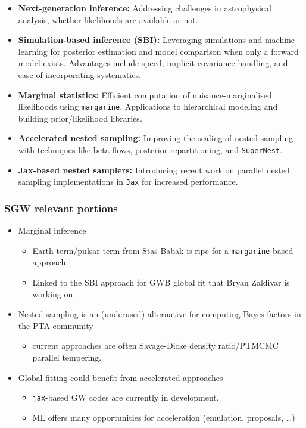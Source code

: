 \documentclass[aspectratio=169]{beamer}
\begin{document}
\begin{frame}
\begin{itemize}
        \item \textbf{Next-generation inference:} Addressing challenges in astrophysical analysis, whether likelihoods are available or not.
        \item \textbf{Simulation-based inference (SBI):{}}  Leveraging simulations and machine learning for posterior estimation and model comparison when only a forward model exists.  Advantages include speed, implicit covariance handling, and ease of incorporating systematics.
        \item \textbf{Marginal statistics:{}}  Efficient computation of nuisance-marginalised likelihoods using \texttt{margarine}. Applications to hierarchical modeling and building prior/likelihood libraries.
        \item \textbf{Accelerated nested sampling:{}}  Improving the scaling of nested sampling with techniques like beta flows, posterior repartitioning, and \texttt{SuperNest}.
        \item \textbf{Jax-based nested samplers:{}}  Introducing recent work on parallel nested sampling implementations in \texttt{Jax} for increased performance.
    \end{itemize}
\end{frame}

\appendix

\begin{frame}
    \frametitle{SGW relevant portions}
    \begin{itemize}
        \item Marginal inference
            \begin{itemize}
                \item Earth term/pulsar term from Stas Babak is ripe for a \texttt{margarine} based approach.
                \item Linked to the SBI approach for GWB global fit that Bryan Zaldivar is working on.
            \end{itemize}
        \item Nested sampling is an (underused) alternative for computing Bayes factors in the PTA community 
            \begin{itemize}
                \item current approaches are often Savage-Dicke density ratio/PTMCMC parallel tempering. 
            \end{itemize}
        \item Global fitting could benefit from accelerated approaches 
            \begin{itemize}
                \item \texttt{jax}-based GW codes are currently in development.
                \item ML offers many opportunities for acceleration (emulation, proposals, \ldots)
            \end{itemize}
    \end{itemize}
\end{frame}
\end{document}
